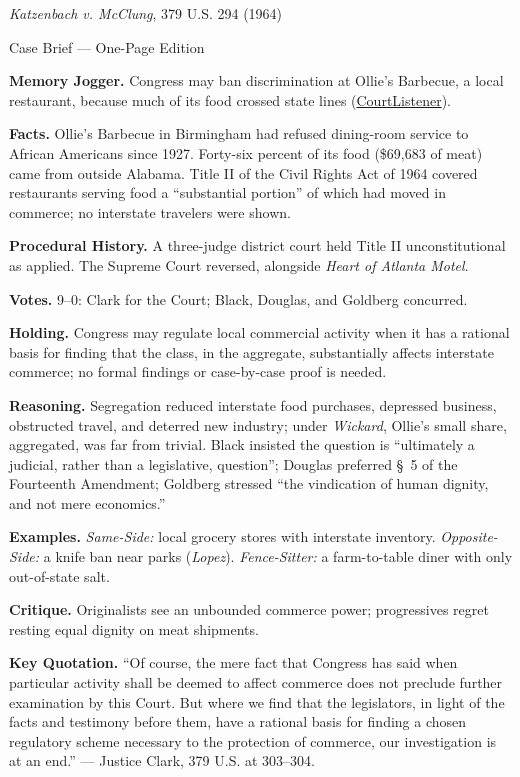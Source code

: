 \documentclass[12pt]{article}
\begin{document}
\begin{center}
{\Large \textit{Katzenbach v. McClung}, 379 U.S. 294 (1964)\par}
\vspace{0.3em}
{\normalsize Case Brief --- One-Page Edition\par}
\end{center}

\textbf{Memory Jogger.} Congress may ban discrimination at Ollie's Barbecue, a local restaurant, because much of its food crossed state lines (\href{https://www.courtlistener.com/opinion/106951/katzenbach-v-mcclung/}{CourtListener}).

\textbf{Facts.} Ollie's Barbecue in Birmingham had refused dining-room service to African Americans since 1927. Forty-six percent of its food (\$69,683 of meat) came from outside Alabama. Title II of the Civil Rights Act of 1964 covered restaurants serving food a ``substantial portion'' of which had moved in commerce; no interstate travelers were shown.

\textbf{Procedural History.} A three-judge district court held Title II unconstitutional as applied. The Supreme Court reversed, alongside \textit{Heart of Atlanta Motel}.

\textbf{Votes.} 9--0: Clark for the Court; Black, Douglas, and Goldberg concurred.

\textbf{Holding.} Congress may regulate local commercial activity when it has a rational basis for finding that the class, in the aggregate, substantially affects interstate commerce; no formal findings or case-by-case proof is needed.

\textbf{Reasoning.} Segregation reduced interstate food purchases, depressed business, obstructed travel, and deterred new industry; under \textit{Wickard}, Ollie's small share, aggregated, was far from trivial. Black insisted the question is ``ultimately a judicial, rather than a legislative, question''; Douglas preferred \S~5 of the Fourteenth Amendment; Goldberg stressed ``the vindication of human dignity, and not mere economics.''

\textbf{Examples.} \emph{Same-Side:} local grocery stores with interstate inventory. \emph{Opposite-Side:} a knife ban near parks (\textit{Lopez}). \emph{Fence-Sitter:} a farm-to-table diner with only out-of-state salt.

\textbf{Critique.} Originalists see an unbounded commerce power; progressives regret resting equal dignity on meat shipments.

\textbf{Key Quotation.} ``Of course, the mere fact that Congress has said when particular activity shall be deemed to affect commerce does not preclude further examination by this Court. But where we find that the legislators, in light of the facts and testimony before them, have a rational basis for finding a chosen regulatory scheme necessary to the protection of commerce, our investigation is at an end.'' --- Justice Clark, 379 U.S. at 303--304.
\end{document}
